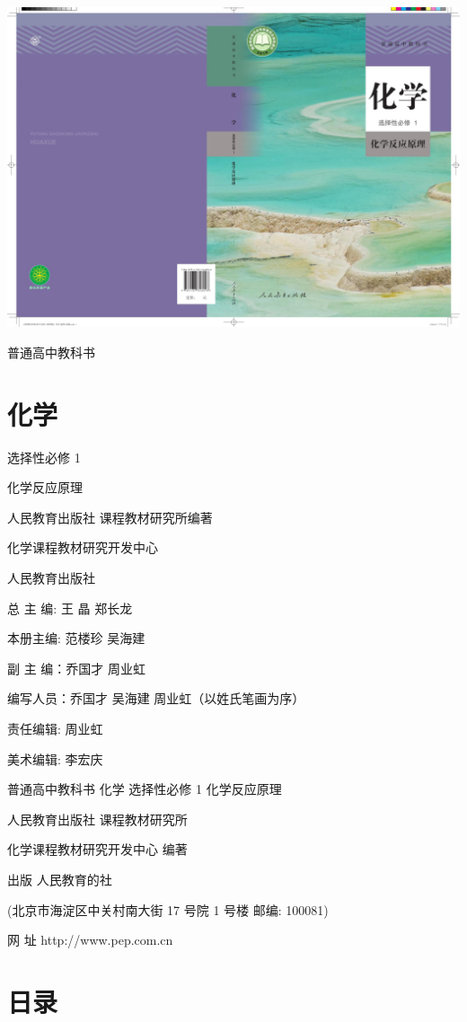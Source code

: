 \documentclass[10pt]{article}
\begin{document}
\begin{center}
\includegraphics[max width=1.0\textwidth]{images/0190da9d-8bfd-732f-bc2c-0b21d0f13b91_1_833643.jpg}
\end{center}

普通高中教科书

\section*{化学}

选择性必修 1

化学反应原理

人民教育出版社 课程教材研究所编著

化学课程教材研究开发中心

人民教育出版社

总 主 编: 王 晶 郑长龙

本册主编: 范楼珍 吴海建

副 主 编：乔国才 周业虹

编写人员：乔国才 吴海建 周业虹（以姓氏笔画为序）

责任编辑: 周业虹

美术编辑: 李宏庆

普通高中教科书 化学 选择性必修 1 化学反应原理

人民教育出版社 课程教材研究所

化学课程教材研究开发中心 编著

出版 人民教育的社

(北京市海淀区中关村南大街 17 号院 1 号楼 邮编: 100081)

网 址 http://www.pep.com.cn

\section*{日录}
\end{document}
